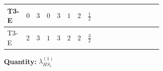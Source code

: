\documentclass[8pt]{article}
\begin{document}
\begin{landscape}
\begin{longtable}{@{}llcccccc >{\raggedright\arraybackslash}p{0.21\linewidth} >{\raggedright\arraybackslash}p{0.21\linewidth} >{\raggedright\arraybackslash}p{0.21\linewidth}@{}}
\midrule
T3-E & $0$ & $3$ & $0$ & $3$ & $1$ & $2$ & $\frac{1}{2}$ & \scriptsize\adjustbox{max width=\linewidth}{$\begin{gathered} {\lambda_{HS_1}^{(1)}} (2 T_{\nu}^{(1)}+6 \operatorname{Tr}\!\left({Y_d}\,\left({Y_d}\right)^{\dagger}\right)+2 \operatorname{Tr}\!\left({Y_e}\,\left({Y_e}\right)^{\dagger}\right)+6 \operatorname{Tr}\!\left({Y_u}\,\left({Y_u}\right)^{\dagger}\right)+4 {\lambda_{S_1}^{(A)}})\end{gathered}$} & \scriptsize\adjustbox{max width=\linewidth}{$\begin{gathered} +6 {g_2}^4\end{gathered}$} & \scriptsize\adjustbox{max width=\linewidth}{$\begin{gathered} +6 {\lambda_{HS_1}^{(A)}}^2\end{gathered}$} \\
\midrule
T3-E & $2$ & $3$ & $1$ & $3$ & $2$ & $2$ & $\frac{3}{2}$ & \scriptsize\adjustbox{max width=\linewidth}{$\begin{gathered} {\lambda_{HS_1}^{(1)}} (2 T_{\nu}^{(1)}+6 \operatorname{Tr}\!\left({Y_d}\,\left({Y_d}\right)^{\dagger}\right)+2 \operatorname{Tr}\!\left({Y_e}\,\left({Y_e}\right)^{\dagger}\right)+6 \operatorname{Tr}\!\left({Y_u}\,\left({Y_u}\right)^{\dagger}\right)+4 {\lambda_{S_1}^{(A)}})\end{gathered}$} & \scriptsize\adjustbox{max width=\linewidth}{$\begin{gathered} +6 {g_2}^4\end{gathered}$} & \scriptsize\adjustbox{max width=\linewidth}{$\begin{gathered} +6 {\lambda_{HS_1}^{(A)}}^2\end{gathered}$} \\
\midrule
\bottomrule
\end{longtable}
\clearpage
\noindent\textbf{Quantity: }$\lambda_{HS_1}^{(1)}$\par\smallskip

\end{landscape}
\end{document}
